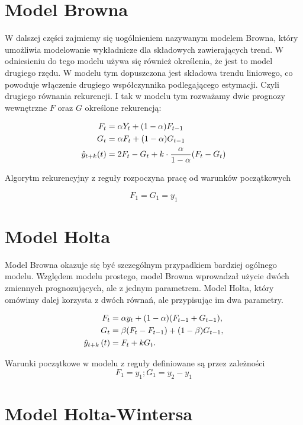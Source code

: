 \documentclass[10pt,a4paper]{book}
\begin{document}
\section{Model Browna}

W dalszej części zajmiemy się uogólnieniem nazywanym modelem Browna, który umożliwia modelowanie wykładnicze dla składowych zawierających trend. W odniesieniu do tego modelu używa się również określenia, że jest to model drugiego rzędu. W modelu tym dopuszczona jest składowa trendu liniowego, co powoduje włączenie drugiego współczynnika podlegającego estymacji. Czyli drugiego równania rekurencji. I tak w modelu tym rozważamy dwie prognozy wewnętrzne $F$ oraz $G$ określone rekurencją:

\begin{align*}
F_t &= \alpha Y_t + (1-\alpha) F_{t-1} \\
G_t &= \alpha F_t + (1-\alpha) G_{t-1} \\
\predict{y}{t+k}(t) &= 2 F_t - G_{t}  + k \cdot \frac{\alpha}{1-\alpha} (F_t - G_{t})
\end{align*}

Algorytm rekurencyjny z reguły rozpoczyna pracę od warunków początkowych

$$
F_1 = G_1 = y_1
$$

\section{Model Holta}

Model Browna okazuje się być szczególnym przypadkiem bardziej ogólnego modelu. Względem modelu prostego, model Browna wprowadzał użycie dwóch zmiennych prognozujących, ale z jednym parametrem. Model Holta, który omówimy dalej korzysta z dwóch równań, ale przypisując im dwa parametry.

\begin{align*}
F_t &= \alpha y_t + (1-\alpha) ( F_{t-1} + G_{t-1} ), \\
G_t &= \beta (F_t - F_{t-1}) + (1-\beta) G_{t-1},\\
\predict[t]{y}{t+k}&= F_t + k G_t.
\end{align*}

Warunki początkowe w modelu z reguły definiowane są przez zależności
$$
F_1 = y_1 ; G_1 = y_2 - y_1
$$

\section{Model Holta-Wintersa}
\end{document}
